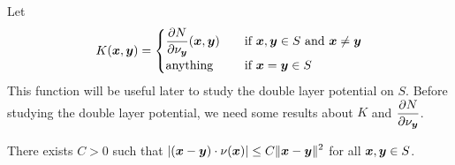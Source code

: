 Let
\begin{equation} \label{pot_K_defn}
K({\bm{x}},{\bm{y}}) =
\begin{cases}
\displaystyle \frac{\partial{N}}{\partial \nu_{{\bm{y}}}}({\bm{x}},{\bm{y}}) &
\quad \text{if} \ {\bm{x}},{\bm{y}} \in S \ \text{and} \ {\bm{x}} \neq {\bm{y}} \\
\text{anything} & \quad \text{if} \ {\bm{x}}={\bm{y}} \in S
\end{cases}
\end{equation}
This function will be useful later to study the double layer
potential on $S$.  Before studying the double layer potential, we need
some results about $K$ and $\displaystyle \frac{\partial{N}}{\partial \nu_{{\bm{y}}}}$.

\begin{lemma} \label{pot_lem_dbl1}
There exists $C>0$ such that
$\displaystyle \left| ({\bm{x}}-{\bm{y}}) \cdot \nu({\bm{x}}) \right| \leq C
\|{\bm{x}}-{\bm{y}}\|^2$ for all ${\bm{x}},{\bm{y}} \in S$.
\end{lemma}

